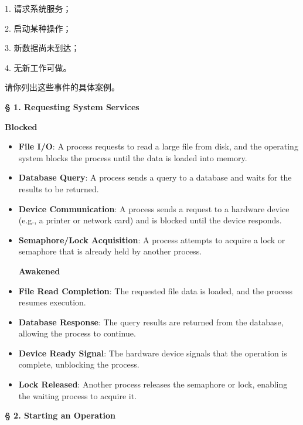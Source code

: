\documentclass[a4paper]{book}
\newcommand{\sfbf}[1]{{\normalsize\textsf{\textbf{§ #1}}}}
\begin{document}
1. 请求系统服务；

2. 启动某种操作；

3. 新数据尚未到达；

4. 无新工作可做。

请你列出这些事件的具体案例。

\sfbf{1. Requesting System Services}

\textbf{Blocked}
\begin{itemize}
\item 
\textbf{File I/O}: A process requests to read a large file from disk, and the operating system blocks the process until the data is loaded into memory.

\item 
\textbf{Database Query}: A process sends a query to a database and waits for the results to be returned.

\item 
\textbf{Device Communication}: A process sends a request to a hardware device (e.g., a printer or network card) and is blocked until the device responds.

\item 
\textbf{Semaphore/Lock Acquisition}: A process attempts to acquire a lock or semaphore that is already held by another process.

\textbf{Awakened}

\item 
\textbf{File Read Completion}: The requested file data is loaded, and the process resumes execution.

\item 
\textbf{Database Response}: The query results are returned from the database, allowing the process to continue.

\item 
\textbf{Device Ready Signal}: The hardware device signals that the operation is complete, unblocking the process.

\item 
\textbf{Lock Released}: Another process releases the semaphore or lock, enabling the waiting process to acquire it.

\end{itemize}

\hrulefill

\sfbf{2. Starting an Operation}
\end{document}
